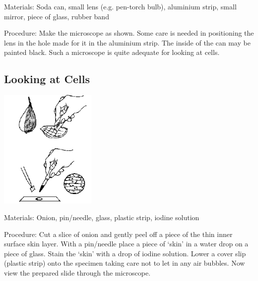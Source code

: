 \begin{multicols}{2}
\begin{description*}
\item[Materials:]{Soda can, small lens (e.g. pen-torch bulb), aluminium strip, small mirror, piece of glass, rubber band}
\item[Procedure:]{Make the microscope as shown.
Some care is needed in
positioning the lens in the hole
made for it in the aluminium
strip. The inside of the can may be
painted black. Such a microscope
is quite adequate for looking at
cells.}
\end{description*}

\subsection{Looking at Cells} %

\begin{center}
\includegraphics[width=0.35\textwidth]{./img/source/looking-cells.png}
\end{center}

\begin{description*}
\item[Materials:]{Onion, pin/needle, glass, plastic strip, iodine solution}
\item[Procedure:]{Cut a slice of onion and gently
peel off a piece of the thin inner
surface skin layer. With a
pin/needle place a piece of `skin'
in a water drop on a piece of
glass. Stain the `skin' with a drop
of iodine solution. Lower a cover
slip (plastic strip) onto the specimen taking care
not to let in any air bubbles.
Now view the prepared
slide through the microscope.}
\end{description*}


\end{multicols}

